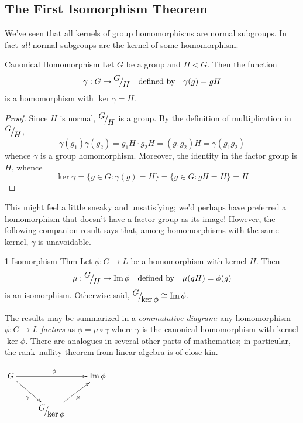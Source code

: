 \clearpage


\subsection{The First Isomorphism Theorem}

We've seen that all kernels of group homomorphisms are normal subgroups. In fact \emph{all} normal subgroups are the kernel of some homomorphism.

\begin{thm}{Canonical Homomorphism}{}
Let $G$ be a group and $H\triangleleft G$. Then the function
\[\gamma:G\to {}^{\textstyle {G}}\!\big/_{\textstyle \!{H}}\quad\text{defined by}\quad \gamma(g)=gH\]
is a homomorphism with $\ker\gamma=H$.
\end{thm}

\begin{proof}
Since $H$ is normal, ${}^{\textstyle {G}}\!\big/_{\textstyle \!{H}}$ is a group. By the definition of multiplication in ${}^{\textstyle {G}}\!\big/_{\textstyle \!{H}}$,
\[\gamma(g_1)\gamma(g_2)=g_1H\cdot g_2H=(g_1g_2)H=\gamma(g_1g_2)\]
whence $\gamma$ is a group homomorphism. Moreover, the identity in the factor group is $H$, whence
  \[\ker\gamma=\{g\in G:\gamma(g)=H\} =\{g\in G:gH=H\}=H\tag*{\qedhere}\]
\end{proof}

This might feel a little sneaky and unsatisfying; we'd perhaps have preferred a homomorphism that doesn't have a factor group as its image! However, the following companion result says that, among homomorphisms with the same kernel, $\gamma$ is unavoidable.

\begin{thm}{1\st{} Isomorphism Thm}{}
Let $\phi:G\to L$ be a homomorphism with kernel $H$. Then
\[\mu:{}^{\textstyle {G}}\!\big/_{\textstyle \!{H}}\to\operatorname{Im}\phi\quad \text{defined by}\quad \mu(gH)=\phi(g)\]
is an isomorphism. Otherwise said, ${}^{\textstyle {G}}\!\big/_{\textstyle \!{\ker\phi}}\cong\operatorname{Im}\phi$.
\end{thm}


\begin{minipage}[t]{0.65\linewidth}
The results may be summarized in a \emph{commutative diagram:} any homomorphism $\phi:G\to L$ \emph{factors} as $\phi=\mu\circ\gamma$ where $\gamma$ is the canonical homomorphism with kernel $\ker\phi$. There are analogues in several other parts of mathematics; in particular, the rank--nullity theorem from linear algebra is of close kin.
\end{minipage}\hfill\begin{minipage}[t]{0.3\linewidth}
\flushright$\xymatrix{G \ar[rr]^{\phi} \ar[dr]_\gamma && \image\phi\\
& \quotient G{\ker\phi} \ar[ur]_{\mu} &}$
\end{minipage}



